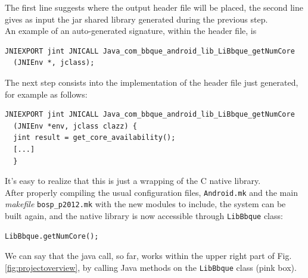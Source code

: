 The first line suggests where the output header file will be placed, the second line gives as input the jar shared library generated during the previous step.\\
An example of an auto-generated signature, within the header file, is
\begin{verbatim}
JNIEXPORT jint JNICALL Java_com_bbque_android_lib_LiBbque_getNumCore
  (JNIEnv *, jclass);
\end{verbatim}
The next step consists into the implementation of the header file just generated, for example as follows:
\begin{verbatim}
JNIEXPORT jint JNICALL Java_com_bbque_android_lib_LiBbque_getNumCore
  (JNIEnv *env, jclass clazz) {
  jint result = get_core_availability();
  [...]
  }
\end{verbatim}
It's easy to realize that this is just a wrapping of the C native library.\\
After properly compiling the usual configuration files, \texttt{Android.mk} and the main \textit{makefile} \texttt{bosp\_p2012.mk} with the new modules to include, the system can be built again, and the native library is now accessible through \texttt{LibBbque} class:
\begin{verbatim}
LibBbque.getNumCore();
\end{verbatim}
We can say that the java call, so far, works within the upper right part of Fig.\ref{fig:projectoverview}, by calling Java methods on the \texttt{LibBbque} class (pink box).
